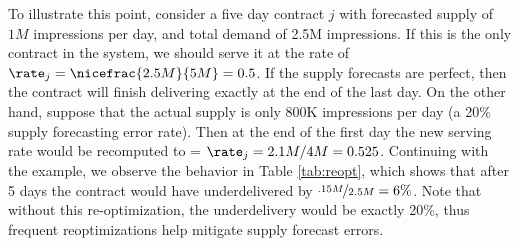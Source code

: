 To illustrate this point, consider a five day contract $j$ with forecasted supply of $1M$ impressions per day, and
total demand of 2.5M impressions. If this is the only contract in the system, we should serve it at the rate of
$\rate_j = \nicefrac{2.5M}{5M} = 0.5$. If the supply forecasts are perfect, then the contract will finish delivering exactly at the end of the last day. On the other hand, suppose that the actual supply is only 800K impressions per day (a 20\% supply forecasting error rate).  Then at the end of the first day the new serving rate would be recomputed to = $\rate_j = 2.1M/4M = 0.525$.  Continuing with the example, we observe the behavior in Table \ref{tab:reopt}, which shows that after 5 days the contract would have underdelivered by $\nicefrac{.15M}{2.5M} = 6\%$.  Note that without this re-optimization, the underdelivery would be exactly 20\%, thus frequent reoptimizations help mitigate supply forecast errors.

